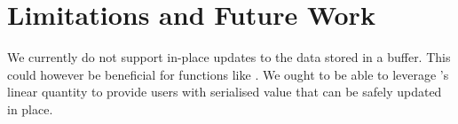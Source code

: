 \section{Limitations and Future Work}


We currently do not support in-place updates to the data stored in a buffer.
This could however be beneficial for functions like .
We ought to be able to leverage \idris{}'s linear quantity to provide users
with serialised value that can be safely updated in place.
